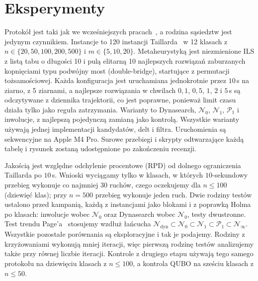 \documentclass[10pt,twocolumn]{article}
\newcommand{\N}{\mathcal{N}}
\newcommand{\Pa}{\mathcal{P}}
\begin{document}
\section{Eksperymenty}\label{sec:exp}

Protokół jest taki jak we wcześniejszych pracach~\cite{windowed_own},
a rodzina sąsiedztw jest jedynym czynnikiem. Instancje to 120 instancji
Taillarda~\cite{taillard1993} w 12 klasach z $n\in\{20,50,100,200,500\}$
i $m\in\{5,10,20\}$. Metaheurystyką jest niezmienione ILS z listą tabu
o długości 10 i pulą elitarną 10 najlepszych rozwiązań zaburzanych
kopnięciami typu podwójny most (double-bridge), startujące z permutacji
tożsamościowej. Każda konfiguracja jest uruchamiana jednokrotnie przez
$10$\,s na ziarno, z 5 ziarnami, a najlepsze rozwiązania w chwilach $0{,}1$,
$0{,}5$, $1$, $2$ i $5$\,s są odczytywane z dziennika trajektorii, co jest
poprawne, ponieważ limit czasu działa tylko jako reguła zatrzymania.
Warianty to Dynasearch, $\N_0$, $\N_1$, $\Pa_1$ i inwolucje, z najlepszą
pojedynczą zamianą jako kontrolą. Wszystkie warianty używają jednej
implementacji kandydatów, delt i filtra. Uruchomienia są sekwencyjne na
Apple M4 Pro. Surowe przebiegi i skrypty odtwarzające każdą tabelę
i rysunek zostaną udostępnione po zakończeniu recenzji.

Jakością jest względne odchylenie procentowe (RPD) od dolnego ograniczenia
Taillarda po $10$\,s. Wnioski wyciągamy tylko w klasach, w których
$10$-sekundowy przebieg wykonuje co najmniej 30 ruchów, czego oczekujemy
dla $n\leq100$ (dziewięć klas); przy $n=500$ przebieg wykonuje jeden ruch.
Dwie rodziny testów ustalono przed kampanią, każdą z instancjami jako
blokami i z poprawką Holma po klasach: inwolucje wobec $\N_0$ oraz
Dynasearch wobec $\N_0$, testy dwustronne. Test trendu Page'a~\cite{page1963}
stosujemy wzdłuż łańcucha
$\N_{\mathrm{dyn}}\subset\N_0\subset\N_1\subset\Pa_1\subset\N_\infty$.
Wszystkie pozostałe porównania są eksploracyjne i tak je podajemy. Rodziny
z krzyżowaniami wykonują mniej iteracji, więc pierwszą rodzinę testów
analizujemy także przy równej liczbie iteracji. Kontrole z drugiego etapu
używają tego samego protokołu na dziewięciu klasach z $n\leq100$,
a kontrola QUBO na sześciu klasach z $n\leq50$.
\end{document}
